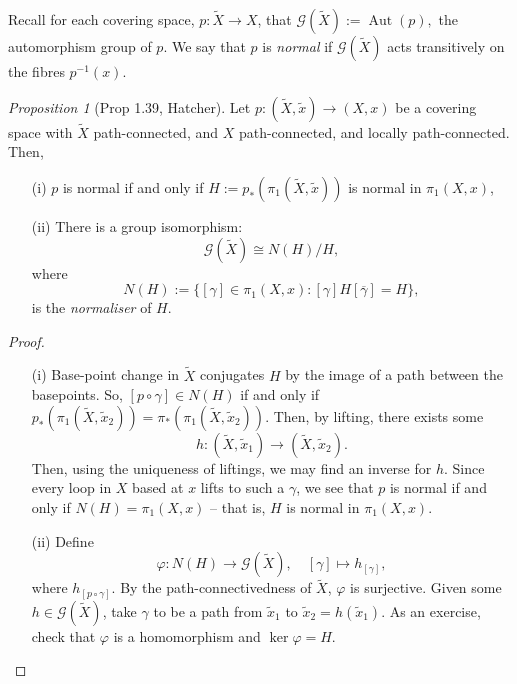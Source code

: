 \documentclass[a4paper]{report}
\theoremstyle{definition}
\theoremstyle{remark}
\theoremstyle{proposition}
\newtheorem{proposition}{Proposition}
\theoremstyle{conjecture}
\theoremstyle{lemma}
\theoremstyle{corollary}
\theoremstyle{exercise}
\newcommand{\mcal}{\mathcal}
\newcommand{\on}{\operatorname}
\begin{document}
Recall for each covering space, 
$p : \widetilde{X} \to X$, that $\mcal{G}(\widetilde{X}) := \on{Aut}(p),$
the automorphism group of $p$. We say that $p$ is \emph{normal} if $\mcal{G}(\widetilde{X})$
acts transitively on the fibres $p^{-1}(x)$.

\begin{proposition}[Prop 1.39, Hatcher]
    Let $p : (\widetilde{X}, \widetilde{x}) \to (X,x)$ be a covering space with $\widetilde{X}$ path-connected, 
    and $X$ path-connected, and locally path-connected.
    Then, \begin{itemize}
        \item[(i)]  $p$ is normal if and only if $H:= p_\ast(\pi_1(\widetilde{X},\widetilde{x}))$ is 
        normal in $\pi_1(X,x)$,
        \item[(ii)] There is a group isomorphism: $$\mcal{G}(\widetilde{X}) \cong N(H)/H,$$ where 
        $$N(H) := \lbrace [\gamma]  \in \pi_1(X,x) : [\gamma] H [\overline{\gamma}] = H\rbrace,$$
        is the \emph{normaliser} of $H$.
    \end{itemize}
\end{proposition}

\begin{proof}
    \leavevmode 
    \begin{itemize}
        \item[(i)] Base-point change in $\widetilde{X}$ conjugates $H$ by the image of a path between 
        the basepoints. So, $[p\circ \gamma] \in N(H)$ if and only if 
        $p_\ast(\pi_1(\widetilde{X},\widetilde{x}_2)) = \pi_\ast(\pi_1(\widetilde{X},\widetilde{x}_2))$.
        Then, by lifting, there exists some 
        $$h : (\widetilde{X},\widetilde{x}_1) \longrightarrow (\widetilde{X}, \widetilde{x}_2).$$ 
        Then, using the uniqueness of liftings, we may find an inverse for $h$. Since every loop in $X$ 
        based at $x$ lifts to such a $\gamma$, we see that $p$ is normal if and only if 
        $N(H) = \pi_1(X,x)$ -- that is, $H$ is normal in $\pi_1(X,x)$. 
        \item[(ii)] Define $$\varphi : N(H) \longrightarrow \mcal{G}(\widetilde{X}), \quad [\gamma] \longmapsto h_{[\gamma]},$$
        where $h_{[p\circ \gamma]}.$ By the path-connectivedness of $\widetilde{X}$, $\varphi$ is surjective.
        Given some $h \in \mcal{G}(\widetilde{X})$, take $\gamma$ to be a path from $\widetilde{x}_1$ 
        to $\widetilde{x}_2 = h(\widetilde{x}_1)$. As an exercise, check that $\varphi$ is a 
        homomorphism and $\ker \varphi = H$.
    \end{itemize}
\end{proof}
\end{document}
